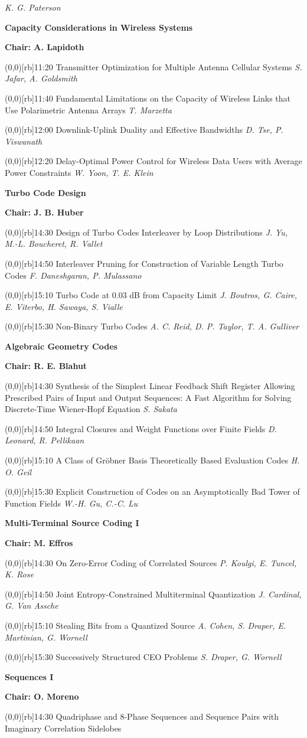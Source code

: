 \documentclass[a5paper,twoside]{article}
\def\period#1{\flushleft{\large\bfseries #1}\markboth{\sf #1}{\sf #1}}
\def\sesstitle#1{\vspace{.45\bigskipamount}\par{\bfseries #1}\par}
\def\sesschair#1{{\bfseries Chair: #1}\par\vspace{.65\medskipamount}}
\def\papertime#1{\makebox(0,0)[rb]{{\scriptsize #1}\hspace{.5em}}}
\def\papertitle#1{#1\hfil\break}
\def\paperauthors#1{{\itshape #1}\par\filbreak\vspace{.65\medskipamount}}
\begin{document}
\paperauthors{K. G. Paterson}
\sesstitle{Capacity Considerations in Wireless Systems}
\sesschair{A. Lapidoth}
\papertime{11:20}%
\papertitle{Transmitter Optimization for Multiple Antenna Cellular Systems}
\paperauthors{S. Jafar, A. Goldsmith}
\papertime{11:40}%
\papertitle{Fundamental Limitations on the Capacity of Wireless Links that Use Polarimetric Antenna Arrays}
\paperauthors{T. Marzetta}
\papertime{12:00}%
\papertitle{Downlink-Uplink Duality and Effective Bandwidths}
\paperauthors{D. Tse, P. Viswanath}
\papertime{12:20}%
\papertitle{Delay-Optimal Power Control for Wireless Data Users with Average Power Constraints}
\paperauthors{W. Yoon, T. E. Klein}
\period{Mon 14:30 -- 15:50}
\sesstitle{Turbo Code Design}
\sesschair{J. B. Huber}
\papertime{14:30}%
\papertitle{Design of Turbo Codes Interleaver by Loop Distributions}
\paperauthors{J. Yu, M.-L. Boucheret, R. Vallet}
\papertime{14:50}%
\papertitle{Interleaver Pruning for Construction of Variable Length Turbo Codes}
\paperauthors{F. Daneshgaran, P. Mulassano}
\papertime{15:10}%
\papertitle{Turbo Code at 0.03 dB from Capacity Limit}
\paperauthors{J. Boutros, G. Caire, E. Viterbo, H. Sawaya, S. Vialle}
\papertime{15:30}%
\papertitle{Non-Binary Turbo Codes}
\paperauthors{A. C. Reid, D. P. Taylor, T. A. Gulliver}
\sesstitle{Algebraic Geometry Codes}
\sesschair{R. E. Blahut}
\papertime{14:30}%
\papertitle{Synthesis of the Simplest Linear Feedback Shift Register Allowing Prescribed Pairs of Input and Output Sequences: A Fast Algorithm for Solving Discrete-Time Wiener-Hopf Equation}
\paperauthors{S. Sakata}
\papertime{14:50}%
\papertitle{Integral Closures and Weight Functions over Finite Fields}
\paperauthors{D. Leonard, R. Pellikaan}
\papertime{15:10}%
\papertitle{A Class of Gr\"obner Basis Theoretically Based Evaluation Codes}
\paperauthors{H. O. Geil}
\papertime{15:30}%
\papertitle{Explicit Construction of Codes on an Asymptotically Bad Tower of Function Fields}
\paperauthors{W.-H. Gu, C.-C. Lu}
\sesstitle{Multi-Terminal Source Coding I}
\sesschair{M. Effros}
\papertime{14:30}%
\papertitle{On Zero-Error Coding of Correlated Sources}
\paperauthors{P. Koulgi, E. Tuncel, K. Rose}
\papertime{14:50}%
\papertitle{Joint Entropy-Constrained Multiterminal Quantization}
\paperauthors{J. Cardinal, G. Van Assche}
\papertime{15:10}%
\papertitle{Stealing Bits from a Quantized Source}
\paperauthors{A. Cohen, S. Draper, E. Martinian, G. Wornell}
\papertime{15:30}%
\papertitle{Successively Structured CEO Problems}
\paperauthors{S. Draper, G. Wornell}
\sesstitle{Sequences I}
\sesschair{O. Moreno}
\papertime{14:30}%
\papertitle{Quadriphase and 8-Phase Sequences and Sequence Pairs with Imaginary Correlation Sidelobes}
\end{document}
